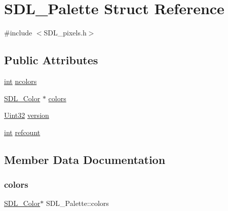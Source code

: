 \hypertarget{struct_s_d_l___palette}{}\section{S\+D\+L\+\_\+\+Palette Struct Reference}
\label{struct_s_d_l___palette}


{\ttfamily \#include $<$S\+D\+L\+\_\+pixels.\+h$>$}

\subsection*{Public Attributes}
\begin{DoxyCompactItemize}
\item 
\mbox{\hyperlink{warnings_8h_a74f207b5aa4ba51c3a2ad59b219a423b}{int}} \mbox{\hyperlink{struct_s_d_l___palette_a81a0cc3197480e994c6b06f1f0567091}{ncolors}}
\item 
\mbox{\hyperlink{struct_s_d_l___color}{S\+D\+L\+\_\+\+Color}} $\ast$ \mbox{\hyperlink{struct_s_d_l___palette_ad757a50037f43533196e94942440b241}{colors}}
\item 
\mbox{\hyperlink{_s_d_l__stdinc_8h_add440eff171ea5f55cb00c4a9ab8672d}{Uint32}} \mbox{\hyperlink{struct_s_d_l___palette_a5b8d45519f6850a32f13f1602ce37a8e}{version}}
\item 
\mbox{\hyperlink{warnings_8h_a74f207b5aa4ba51c3a2ad59b219a423b}{int}} \mbox{\hyperlink{struct_s_d_l___palette_a35c667737f883f973bb0a8dea143b08d}{refcount}}
\end{DoxyCompactItemize}


\subsection{Member Data Documentation}
\mbox{\label{struct_s_d_l___palette_ad757a50037f43533196e94942440b241}} 
\subsubsection{\texorpdfstring{colors}{colors}}
{\footnotesize\ttfamily \mbox{\hyperlink{struct_s_d_l___color}{S\+D\+L\+\_\+\+Color}}$\ast$ S\+D\+L\+\_\+\+Palette\+::colors}

\mbox{\label{struct_s_d_l___palette_a81a0cc3197480e994c6b06f1f0567091}} 

